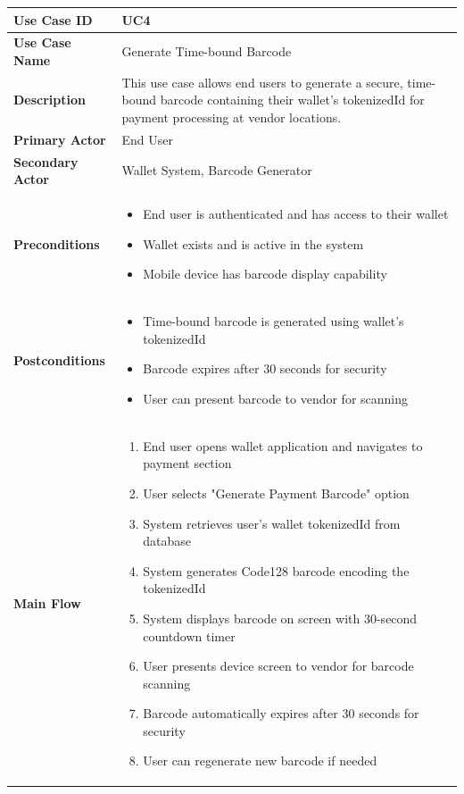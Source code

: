 \begin{longtable}{|p{3cm}|p{11cm}|}
\hline
\textbf{Use Case ID} & UC4 \\
\hline
\textbf{Use Case Name} & Generate Time-bound Barcode \\
\hline
\textbf{Description} & This use case allows end users to generate a secure, time-bound barcode containing their wallet's tokenizedId for payment processing at vendor locations. \\
\hline
\textbf{Primary Actor} & End User \\
\hline
\textbf{Secondary Actor} & Wallet System, Barcode Generator \\
\hline
\textbf{Preconditions} & 
\begin{itemize}[nosep,leftmargin=*]
\item End user is authenticated and has access to their wallet
\item Wallet exists and is active in the system
\item Mobile device has barcode display capability
\end{itemize} \\
\hline
\textbf{Postconditions} & 
\begin{itemize}[nosep,leftmargin=*]
\item Time-bound barcode is generated using wallet's tokenizedId
\item Barcode expires after 30 seconds for security
\item User can present barcode to vendor for scanning
\end{itemize} \\
\hline
\textbf{Main Flow} & 
\begin{enumerate}[nosep,leftmargin=*]
\item End user opens wallet application and navigates to payment section
\item User selects "Generate Payment Barcode" option
\item System retrieves user's wallet tokenizedId from database
\item System generates Code128 barcode encoding the tokenizedId
\item System displays barcode on screen with 30-second countdown timer
\item User presents device screen to vendor for barcode scanning
\item Barcode automatically expires after 30 seconds for security
\item User can regenerate new barcode if needed
\end{enumerate} \\

\end{longtable}
